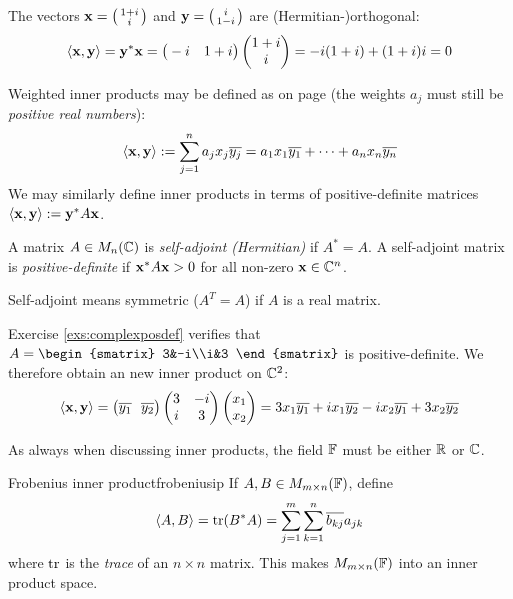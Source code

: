 
\begin{example}{}{}
	The vectors ${\mathbf{x}}=\left(\begin{smallmatrix}1+i\\i\end{smallmatrix}\right)$ and ${\mathbf{y}}=\left(\begin{smallmatrix}i\\1-i\end{smallmatrix}\right)$ are (Hermitian-)orthogonal:
	\[
		\left\langle {\mathbf{x}},{\mathbf{y}}\right\rangle={\mathbf{y}}^*{\mathbf{x}} =\big(-i\quad 1+i\big)\begin{pmatrix}1+i\\i\end{pmatrix} =-i(1+i)+(1+i)i =0
	\]
\end{example}

Weighted inner products may be defined as on page \pageref{ex:ipsweight} (the weights $a_j$ must still be \emph{positive real numbers}):
\[
	\left\langle {\mathbf{x}},{\mathbf{y}}\right\rangle :=\sum_{j=1}^na_jx_j\overline{y_j}
	=a_1x_1\overline{y_1}+\cdots+a_nx_n\overline{y_n}
\]
We may similarly define inner products in terms of positive-definite matrices $\left\langle {\mathbf{x}},{\mathbf{y}}\right\rangle:={\mathbf{y}}^*A{\mathbf{x}}$.

\begin{defn}{}{}
	A matrix $A\in M_n(\mathbb{C})$ is \emph{self-adjoint (Hermitian)} if $A^*=A$. A self-adjoint matrix is \emph{positive-definite} if ${\mathbf{x}}^*A{\mathbf{x}}>0$ for all non-zero ${\mathbf{x}}\in\mathbb{C}^n$.
\end{defn}

Self-adjoint means symmetric ($A^T=A$) if $A$ is a real matrix.

\begin{example}{}{}
	Exercise \ref{exs:complexposdef} verifies that $A=
	\begin{smatrix}
		3&-i\\i&3
	\end{smatrix}$ is positive-definite. We therefore obtain an new inner product on $\mathbb{C}^2$:
	\[
		\left\langle {\mathbf{x}},{\mathbf{y}}\right\rangle=\bigl(\overline{y_1}\ \ \overline{y_2}\bigr)
		\begin{pmatrix}
			3&-i\\i&3
		\end{pmatrix}
		\begin{pmatrix}x_1\\x_2\end{pmatrix} =
		3x_1\overline{y_1}+ix_1\overline{y_2}-ix_2\overline{y_1}+3x_2\overline{y_2}
	\]
\end{example}


\pagebreak[3]



As always when discussing inner products, the field $\mathbb{F}$ must be either $\mathbb{R}$ or $\mathbb{C}$.

\begin{defn}{Frobenius inner product}{frobeniusip}
	If $A,B\in M_{m\times n}(\mathbb{F})$, define
	\[
		\left\langle A,B\right\rangle=\operatorname{tr}(B^*A) =\sum_{j=1}^m\sum_{k=1}^n \overline{b_{kj}}a_{jk}
	\]
	where $\operatorname{tr}$ is the \emph{trace} of an $n\times n$ matrix. This makes $M_{m\times n}(\mathbb{F})$ into an inner product space.
\end{defn}

